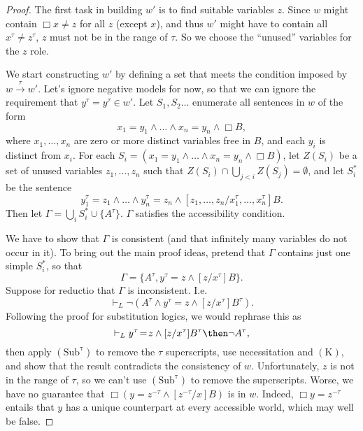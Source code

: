 \documentclass[11pt]{woarticle}
\theoremstyle{break}
\theoremstyle{nonumberplain}
\newcommand{\1}{\;\,|\;\,}
\newcommand{\T}[1]{\ensuremath{(\mathrm{ #1})}}
\begin{document}
\begin{proof}
{    The first task in building $w'$ is to find suitable variables
    $z$. Since $w$ might contain $\Box x\!\not=\!z$ for all $z$
    (except $x$), and thus $w'$ might have to contain all $x^\tau
    \!\not=\!z^\tau$, $z$ must not be in the range of $\tau$. So we
    choose the ``unused'' variables for the $z$ role.

    We start constructing $w'$ by defining a set that meets the
    condition imposed by $w\xrightarrow{\tau}w'$.  Let's ignore
    negative models for now, so that we can ignore the requirement
    that $y^\tau\!=\!y^\tau \in w'$.  Let $S_1, S_2 \ldots$ enumerate
    all sentences in $w$ of the form
    \[
    x_1\!=\!y_1 \land \ldots \land x_n\!=\!y_n \land \Box B,
    \]
    where $x_1,\ldots,x_n$ are zero or more distinct variables free in
    $B$, and each $y_i$ is distinct from $x_i$. For each $S_i =
    (x_1\!=\!y_1 \land \ldots \land x_n\!=\!y_n \land \Box B)$, let
    $Z(S_i)$ be a set of unused variables $z_1,\ldots,z_n$ such that
    $Z(S_i) \cap \bigcup_{j<i} Z(S_j) = \emptyset$, and let $S_i^*$ be
    the sentence
    \[
    y_1^\tau\!=\!z_1 \land \ldots \land y_n^\tau\!=\!z_n \land 
    [z_1,\ldots,z_n/x_1^\tau,\ldots,x_n^\tau]B.
    \]
    Then let $\Gamma = \bigcup_i S_i^* \cup \{ A^\tau \}$.  $\Gamma$
    satisfies the accessibility condition.

    We have to show that $\Gamma$ is consistent (and that infinitely
    many variables do not occur in it). To bring out the main proof ideas,
    pretend that $\Gamma$ contains just one simple $S_i^*$, so that
    \[
    \Gamma = \{ A^\tau,  y^\tau\!=\!z \land [z/x^\tau]B \}.
    \]
    Suppose for reductio that $\Gamma$ is inconsistent. I.e.
    \begin{equation}\tag{1}
      \vdash_L \neg (A^\tau \land y^\tau\!=\!z \land [z/x^\tau]B^\tau).
    \end{equation}
    Following the proof for substitution logics, we would rephrase
    this as
    \begin{equation*}
      \vdash_L y^\tau\!=\!z \land [z/x^\tau]B^\tau \then \neg A^\tau,
    \end{equation*}
    then apply \T{Sub^\tau} to remove the $\tau$ superscripts, use
    necessitation and \T{K}, and show that the result contradicts the
    consistency of $w$. Unfortunately, $z$ is not in the range of
    $\tau$, so we can't use \T{Sub^\tau} to remove the
    superscripts. Worse, we have no guarantee that
    $\Box(y\!=\!z^{-\tau} \land [z^{-\tau}/x]B)$ is in $w$. Indeed,
    $\Box y\!=\!z^{-\tau}$ entails that $y$ has a unique counterpart
    at every accessible world, which may well be false.

}
\end{proof}
\end{document}
